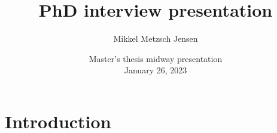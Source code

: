\documentclass[
	10pt, %
]{beamer}
\title[PhD interview presentation]{PhD interview presentation} %
\author[Mikkel Metzsch Jensen]{Mikkel Metzsch Jensen} %
\institute[UiO]{University of Oslo} %
\date[\today]{Master's thesis midway presentation \\ January 26, 2023} %
\begin{document}

\begin{frame}
	\titlepage %
\end{frame}



	



\section{Introduction}
\end{document}
